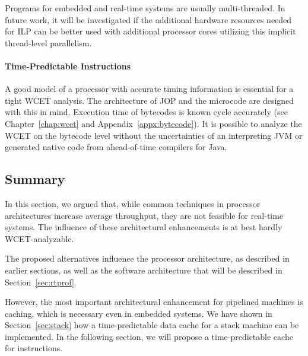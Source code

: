 Programs for embedded and real-time systems are usually
multi-threaded. In future work, it will be investigated if the
additional hardware resources needed for ILP can be better used with
additional processor cores utilizing this implicit thread-level
parallelism.

\paragraph{Time-Predictable Instructions}

A good model of a processor with accurate timing information is
essential for a tight WCET analysis. The architecture of JOP and the
microcode are designed with this in mind. Execution time of bytecodes
is known cycle accurately (see Chapter~\ref{chap:wcet} and
Appendix~\ref{appx:bytecode}). It is possible to analyze the WCET on
the bytecode level \cite{R:Bernat:2000a} without the uncertainties of
an interpreting JVM \cite{R:Bate:2000a} or generated native code from
ahead-of-time compilers for Java.

\subsection{Summary}

In this section, we argued that, while common techniques in
processor architectures increase average throughput, they are not
feasible for real-time systems. The influence of these architectural
enhancements is at best hardly WCET-analyzable.

The proposed alternatives influence the processor architecture, as
described in earlier sections, as well as the software architecture
that will be described in Section~\ref{sec:rtprof}.

However, the most important architectural enhancement for pipelined
machines is caching, which is necessary even in embedded systems. We
have shown in Section~\ref{sec:stack} how a time-predictable data
cache for a stack machine can be implemented. In the following
section, we will propose a time-predictable cache for instructions.
